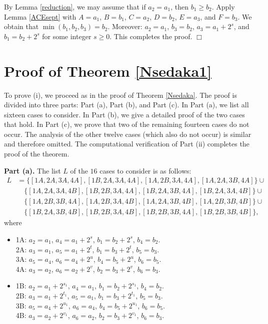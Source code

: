 \documentclass[12pt, reqno]{article}
\theoremstyle{plain}
\theoremstyle{definition}
\theoremstyle{remark}
\begin{document}
By Lemma \ref{reduction}, we may assume that if $a_2 = a_1$, then $b_1 \geq b_2$.  
Apply Lemma \ref{ACEsept} with $A = a_1$, $B = b_1$, $C = a_2$, $D = b_2$, $E = a_3$, and $F = b_3$. We obtain that $\min(b_1, b_2, b_3) = b_2$. Moreover: $a_2=a_1$,  $b_3=b_2$, $a_3 =a_1 + 2^s$, and  $b_1 =b_2 + 2^s$ for some integer $s \geq 0$. 
This completes the proof.
\hfill $\Box$


\section{Proof of Theorem \ref{Nsedaka1}}
\label{tres}


To prove (i), we proceed as in the proof of Theorem \ref{Nsedaka}. The proof is divided into three parts: Part (a), Part (b), and Part (c). In Part (a), we list all sixteen cases to consider. In Part (b), we give a detailed proof of the two cases that hold. In Part (c), we prove that two of the remaining fourteen cases do not occur. The analysis of the other twelve cases (which also do not occur) is similar and therefore omitted. The computational verification of Part (ii) completes the proof of the theorem.

\textbf{Part (a).} The list $L$ of the $16$ cases to consider is as follows:
\begin{align}
\label{sixteen1}
L &= \{[1A,2A,3A,4A], [1B,2A,3A,4A], [1A,2B,3A,4A], [1A,2A,3B,4A]\} \cup \\
\label{sixteen2}
&\quad \{[1A,2A,3A,4B], [1B,2B,3A,4A], [1B,2A,3B,4A], [1B,2A,3A,4B]\} \cup \\
\label{sixteen3}
&\quad \{[1A,2B,3B,4A], [1A,2B,3A,4B], [1A,2A,3B,4B], [1A,2B,3B,4B]\} \cup \\
\label{sixteen4}
&\quad \{[1B,2A,3B,4B], [1B,2B,3A,4B], [1B,2B,3B,4A], [1B,2B,3B,4B]\},
\end{align}
where
\begin{itemize}
\item
1A: $a_2 = a_1$, $a_4 = a_1 + 2^s$, $b_1 = b_2 + 2^s$, $b_4 = b_2$.\\
2A: $a_3 = a_1$, $a_5 = a_1 + 2^t$, $b_1 = b_3 + 2^t$, $b_5 = b_3$.\\
3A: $a_5 = a_4$, $a_6 = a_4 + 2^u$, $b_4 = b_5 + 2^u$, $b_6 = b_5$.\\
4A: $a_3 = a_2$, $a_6 = a_2 + 2^v$, $b_2 = b_3 + 2^v$, $b_6 = b_3$.
\item
1B: $a_2 = a_1 + 2^{s_1}$, $a_4 = a_1$, $b_1 = b_2 + 2^{s_1}$, $b_4 = b_2$.\\
2B: $a_3 = a_1 + 2^{t_1}$, $a_5 = a_1$, $b_1 = b_3 + 2^{t_1}$, $b_5 = b_3$.\\
3B: $a_5 = a_4 + 2^{u_1}$, $a_6 = a_4$, $b_4 = b_5 + 2^{u_1}$, $b_6 = b_5$.\\
4B: $a_3 = a_2 + 2^{v_1}$, $a_6 = a_2$, $b_2 = b_3 + 2^{v_1}$, $b_6 = b_3$.
\end{itemize}
\end{document}
